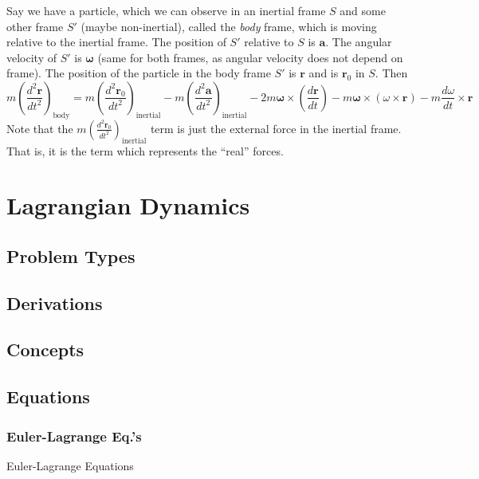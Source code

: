 \documentclass[25pt]{book}
\begin{document}
	Say we have a particle, which we can observe in an inertial frame $S$ and some other frame $S'$ (maybe non-inertial), called the \textit{body} frame, which is moving relative to the inertial frame. The position of $S'$ relative to $S$ is $\textbf{a}$. The angular velocity of $S'$ is $\bm{\omega}$ (same for both frames, as angular velocity does not depend on frame). The position of the particle in the body frame $S'$ is $\textbf{r}$ and is $\textbf{r}_0$ in $S$. Then
	\[
	m \left( \frac{d^2 \textbf{r}}{dt^2} \right)_{\text{body}} = m \left( \frac{d^2 \textbf{r}_0}{dt^2} \right)_{\text{inertial}}
	- m \left( \frac{d^2 \textbf{a}}{dt^2} \right)_{\text{inertial}} - 2 m \bm{\omega} \times \left( \frac{d \textbf{r}}{dt} \right) - m \bm{\omega} \times \left( \omega \times \textbf{r} \right) - m \frac{d\omega}{dt} \times \textbf{r}
	\]
	Note that the $m \left( \frac{d^2 \textbf{r}_0}{dt^2} \right)_{\text{inertial}}$ term is just the external force in the inertial frame. That is, it is the term which represents the ``real'' forces. 
	
	\chapter{Lagrangian Dynamics}
	
	\section{Problem Types}
	
	\section{Derivations}
	
	\section{Concepts}
	
	\section{Equations}
	

	
	
	
	\subsection{Euler-Lagrange Eq.'s}
	
	Euler-Lagrange Equations
	
\end{document}
